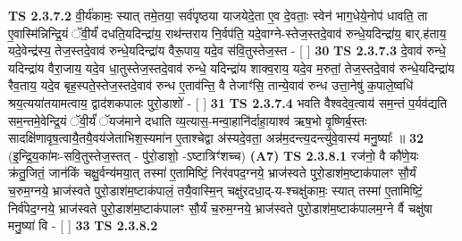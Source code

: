\documentclass[17pt]{extarticle}
\begin{document}
                  \newline
                                \textbf{ TS 2.3.7.2} \newline
                  वी॒र्य॑कामः॒ स्यात् तमे॒तया॒ सर्व॑पृष्ठया याजयेदे॒ता ए॒व दे॒वताः॒ स्वेन॑ भाग॒धेये॒नोप॑ धावति॒ ता ए॒वास्मि॑न्निन्द्रि॒यं ॅवी॒र्यं॑ दधति॒यदिन्द्रा॑य॒ राथ॑न्तराय नि॒र्वप॑ति॒ यदे॒वाग्ने-स्तेज॒स्तदे॒वाव॑ रुन्धे॒यदिन्द्रा॑य॒ बार्.ह॑ताय॒ यदे॒वेन्द्र॑स्य॒ तेज॒स्तदे॒वाव॑ रुन्धे॒यदिन्द्रा॑य वैरू॒पाय॒ यदे॒व स॑वि॒तुस्तेज॒स्त - [  ] \textbf{  30} \newline
                  \newline
                                \textbf{ TS 2.3.7.3} \newline
                  दे॒वाव॑ रुन्धे॒ यदिन्द्रा॑य वैरा॒जाय॒ यदे॒व धा॒तुस्तेज॒स्तदे॒वाव॑ रुन्धे॒ यदिन्द्रा॑य शाक्व॒राय॒ यदे॒व म॒रुतां॒ तेज॒स्तदे॒वाव॑ रुन्धे॒यदिन्द्रा॑य रैव॒ताय॒ यदे॒व बृह॒स्पते॒स्तेज॒स्तदे॒वाव॑ रुन्ध ए॒ताव॑न्ति॒ वै तेजाꣳ॑सि॒ तान्ये॒वाव॑ रुन्ध उत्ता॒नेषु॑ क॒पाले॒ष्वधि॑ श्रय॒त्यया॑तयामत्वाय॒ द्वाद॑शकपालः पुरो॒डाशो॑ - [  ] \textbf{  31} \newline
                  \newline
                                \textbf{ TS 2.3.7.4} \newline
                  भवति वैश्वदेव॒त्वाय॑ सम॒न्तं प॒र्यव॑द्यति सम॒न्तमे॒वेन्द्रि॒यं ॅवी॒र्यं॑ ॅयज॑माने दधाति व्य॒त्यास॒-मन्वा॒हानि॑र्दाहा॒याश्व॑ ऋष॒भो वृ॒ष्णिर्ब॒स्तः सादक्षि॑णावृष॒त्वायै॒तयै॒वय॑जेताभिश॒स्यमा॑न ए॒ताश्चेद्वा अ॑स्यदे॒वता॒ अन्न॑म॒दन्त्य॒दन्त्यु॑वे॒वास्य॑ मनु॒ष्याः᳚ ॥ \textbf{  32 } \newline
                  \newline
                      (इ॒न्द्रि॒य॒का॑मः-सवि॒तुस्तेज॒स्तत् - पु॑रो॒डाशो॒ -ऽष्टात्रिꣳ॑शच्च)  \textbf{(A7)} \newline \newline
                                        \textbf{ TS 2.3.8.1} \newline
                  रज॑नो॒ वै कौ॑णे॒यः क्र॑तु॒जितं॒ जान॑किं चक्षु॒र्वन्य॑मया॒त् तस्मा॑ ए॒तामिष्टिं॒ निर॑वपद॒ग्नये॒ भ्राज॑स्वते पुरो॒डाश॑म॒ष्टाक॑पालꣳ सौ॒र्यं च॒रुम॒ग्नये॒ भ्राज॑स्वते पुरो॒डाश॑म॒ष्टाक॑पालं॒ तयै॒वास्मि॒न् चक्षु॑रदधा॒द्-य-श्चक्षु॑कामः॒ स्यात् तस्मा॑ ए॒तामिष्टिं॒ निर्व॑पेद॒ग्नये॒ भ्राज॑स्वते पुरो॒डाश॑म॒ष्टाक॑पालꣳ सौ॒र्यं च॒रुम॒ग्नये॒ भ्राज॑स्वते पुरो॒डाश॑म॒ष्टाक॑पालम॒ग्ने र्वै चक्षु॑षा मनु॒ष्या॑ वि - [  ] \textbf{  33} \newline
                  \newline
                                \textbf{ TS 2.3.8.2} \newline
\end{document}
